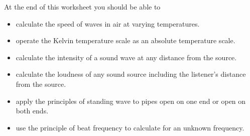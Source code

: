 At the end of this worksheet you should be able to  
\begin{itemize}
	\item calculate the speed of waves in air at varying temperatures.
	\item operate the Kelvin temperature scale as an absolute temperature scale.
	\item calculate the intensity of a sound wave at any distance from the source.
	\item calculate the loudness of any sound source including the listener's distance from the source.
	\item apply the principles of standing wave to pipes open on one end or open on both ends.
	\item use the principle of beat frequency to calculate for an unknown frequency.
\end{itemize}


